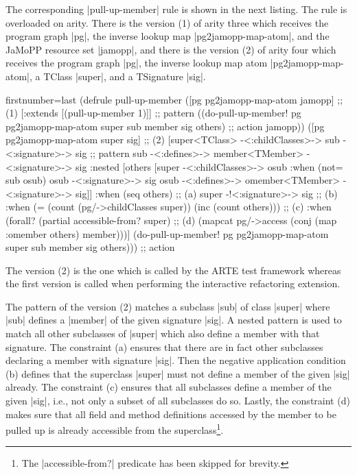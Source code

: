 \documentclass[submission]{eptcs}
\newcommand{\code}{\clojureinline}
\begin{document}
The corresponding \code|pull-up-member| rule is shown in the next listing.  The
rule is overloaded on arity.  There is the version (1) of arity three which
receives the program graph \code|pg|, the inverse lookup map
\code|pg2jamopp-map-atom|, and the JaMoPP resource set \code|jamopp|, and there
is the version (2) of arity four which receives the program graph \code|pg|,
the inverse lookup map atom \code|pg2jamopp-map-atom|, a \textsf{TClass}
\code|super|, and a \textsf{TSignature} \code|sig|.
\begin{clojurecode*}{firstnumber=last}
(defrule pull-up-member
  ([pg pg2jamopp-map-atom jamopp]                                             ;; (1)
   [:extends [(pull-up-member 1)]]                                            ;; pattern
   ((do-pull-up-member! pg pg2jamopp-map-atom super sub member sig others)    ;; action
    jamopp))
  ([pg pg2jamopp-map-atom super sig]                                          ;; (2)
   [super<TClass> -<:childClasses>-> sub -<:signature>-> sig                  ;; pattern
    sub -<:defines>-> member<TMember> -<:signature>-> sig
    :nested [others [super -<:childClasses>-> osub
                     :when (not= sub osub)
                     osub -<:signature>-> sig
                     osub -<:defines>-> omember<TMember> -<:signature>-> sig]]
    :when (seq others)                                                        ;; (a)
    super -!<:signature>-> sig                                                ;; (b)
    :when (= (count (pg/->childClasses super)) (inc (count others)))          ;; (c)
    :when (forall? (partial accessible-from? super)                           ;; (d)
                   (mapcat pg/->access (conj (map :omember others) member)))]
   (do-pull-up-member! pg pg2jamopp-map-atom super sub member sig others)))   ;; action
\end{clojurecode*}

The version (2) is the one which is called by the ARTE test framework whereas
the first version is called when performing the interactive refactoring
extension.

The pattern of the version (2) matches a subclass \code|sub| of class
\code|super| where \code|sub| defines a \code|member| of the given signature
\code|sig|.  A nested pattern is used to match all other subclasses of
\code|super| which also define a member with that signature.  The constraint
(a) ensures that there are in fact other subclasses declaring a member with
signature \code|sig|.  Then the negative application condition (b) defines that
the superclass \code|super| must not define a member of the given \code|sig|
already.  The constraint (c) ensures that all subclasses define a member of the
given \code|sig|, i.e., not only a subset of all subclasses do so.  Lastly, the
constraint (d) makes sure that all field and method definitions accessed by the
member to be pulled up is already accessible from the superclass\footnote{The
  \code|accessible-from?| predicate has been skipped for brevity.}.
\end{document}
